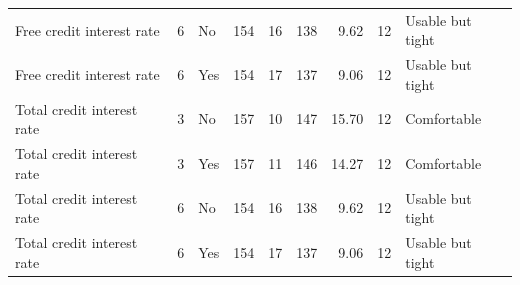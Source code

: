 \begin{table}
\begin{tabular}[t]{lrlrrrrrl}
Free credit interest rate & 6 & No & 154 & 16 & 138 & 9.62 & 12 & Usable but tight\\
Free credit interest rate & 6 & Yes & 154 & 17 & 137 & 9.06 & 12 & Usable but tight\\
\addlinespace
Total credit interest rate & 3 & No & 157 & 10 & 147 & 15.70 & 12 & Comfortable\\
Total credit interest rate & 3 & Yes & 157 & 11 & 146 & 14.27 & 12 & Comfortable\\
Total credit interest rate & 6 & No & 154 & 16 & 138 & 9.62 & 12 & Usable but tight\\
Total credit interest rate & 6 & Yes & 154 & 17 & 137 & 9.06 & 12 & Usable but tight\\
\bottomrule
\end{tabular}
\end{table}
